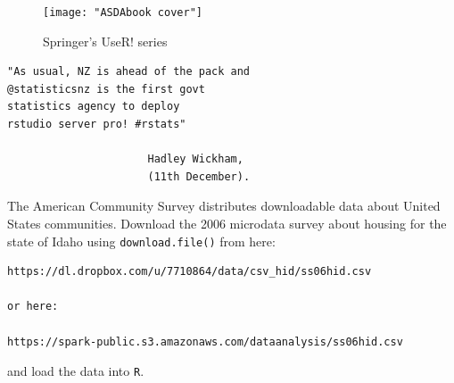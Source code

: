 \documentclass{beamer}
\begin{document}
\begin{frame}
	
	
	
	
	\begin{figure}
\centering
\texttt{[image: "ASDAbook cover"]}
\caption{Springer's UseR! series}
\end{figure}

\end{frame}
\begin{frame}[fragile]
\Large
\begin{framed}
\begin{verbatim}
"As usual, NZ is ahead of the pack and 
@statisticsnz is the first govt 
statistics agency to deploy 
rstudio server pro! #rstats"

                      Hadley Wickham, 
                      (11th December).
\end{verbatim}
\end{framed}

\end{frame}

	
\begin{frame}[fragile]
The American Community Survey distributes downloadable data about United States communities. 
Download the 2006 microdata survey about housing for the state of Idaho using \texttt{download.file()} from here: 

\begin{verbatim}
https://dl.dropbox.com/u/7710864/data/csv_hid/ss06hid.csv

or here:

https://spark-public.s3.amazonaws.com/dataanalysis/ss06hid.csv 
\end{verbatim}
and load the data into \texttt{R}. 
\end{frame}
\end{document}
